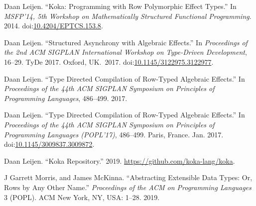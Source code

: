 \documentclass{llncs}
\begin{document}
{\begin{thebibliography}{20}
\mdbibitemlabel{{}[7]}Daan Leijen. \textquotedblleft{}Koka: Programming with Row Polymorphic Effect Types.\textquotedblright{} In \emph{MSFP’14, 5th Workshop on Mathematically Structured Functional Programming}. 2014. doi:\href{https://dx.doi.org/10.4204/EPTCS.153.8}{10.4204/EPTCS.153.8}.%

\mdbibitemlabel{{}[8]}Daan Leijen. \textquotedblleft{}Structured Asynchrony with Algebraic Effects.\textquotedblright{} In \emph{Proceedings of the 2nd ACM SIGPLAN International Workshop on Type-Driven Development}, 16–29. TyDe 2017. Oxford, UK.~2017. doi:\href{https://dx.doi.org/10.1145/3122975.3122977}{10.1145/3122975.3122977}.%

\mdbibitemlabel{{}[9]}Daan Leijen. \textquotedblleft{}Type Directed Compilation of Row-Typed Algebraic Effects.\textquotedblright{} In \emph{Proceedings of the 44th ACM SIGPLAN Symposium on Principles of Programming Languages}, 486–499. 2017.%

\mdbibitemlabel{{}[10]}Daan Leijen. \textquotedblleft{}Type Directed Compilation of Row-Typed Algebraic Effects.\textquotedblright{} In \emph{Proceedings of the 44th ACM SIGPLAN Symposium on Principles of Programming Languages (POPL’17)}, 486–499. Paris, France. Jan. 2017. doi:\href{https://dx.doi.org/10.1145/3009837.3009872}{10.1145/3009837.3009872}.%

\mdbibitemlabel{{}[11]}Daan Leijen. \textquotedblleft{}Koka Repository.\textquotedblright{} 2019. \href{https://github.com/koka-lang/koka}{{\ttfamily https://\hspace{0pt}github.\hspace{0pt}com/\hspace{0pt}koka-\hspace{0pt}lang/\hspace{0pt}koka}}.%

\mdbibitemlabel{{}[12]}J Garrett Morris, and James McKinna. \textquotedblleft{}Abstracting Extensible Data Types: Or, Rows by Any Other Name.\textquotedblright{} \emph{Proceedings of the ACM on Programming Languages} 3 (POPL). ACM New York, NY, USA: 1–28. 2019.%


\end{thebibliography}}
\end{document}

